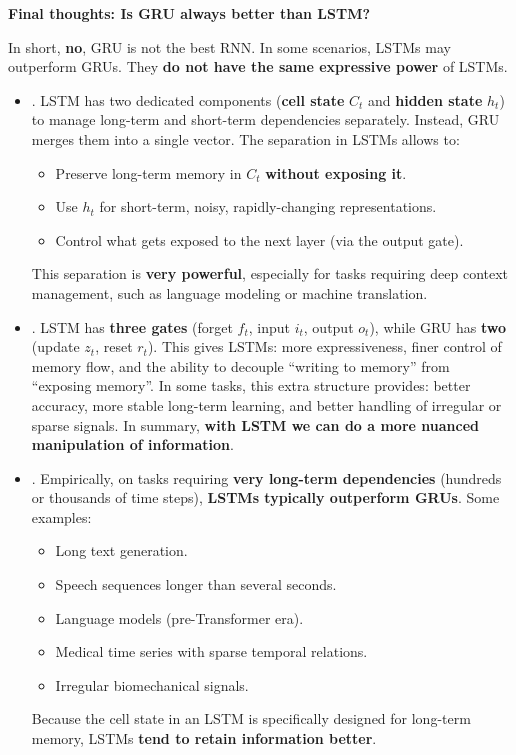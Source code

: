 \begin{flushleft}
    \textcolor{Green3}{ \textbf{Final thoughts: Is GRU always better than LSTM?}}
\end{flushleft}
In short, \textbf{no}, GRU is not the best RNN. In some scenarios, LSTMs may outperform GRUs. They \textbf{do not have the same expressive power} of LSTMs.
\begin{itemize}
    \item {}. LSTM has two dedicated components (\textbf{cell state} $C_t$ and \textbf{hidden state} $h_t$) to manage long-term and short-term dependencies separately. Instead, GRU merges them into a single vector. The separation in LSTMs allows to:
    \begin{itemize}
        \item Preserve long-term memory in $C_t$ \textbf{without exposing it}.
        \item Use $h_t$ for short-term, noisy, rapidly-changing representations.
        \item Control what gets exposed to the next layer (via the output gate).
    \end{itemize}
    This separation is \textbf{very powerful}, especially for tasks requiring deep context management, such as language modeling or machine translation.


    \item {}. LSTM has \textbf{three gates} (forget $f_t$, input $i_t$, output $o_t$), while GRU has \textbf{two} (update $z_t$, reset $r_t$). This gives LSTMs: more expressiveness, finer control of memory flow, and the ability to decouple ``writing to memory'' from ``exposing memory''. In some tasks, this extra structure provides: better accuracy, more stable long-term learning, and better handling of irregular or sparse signals. In summary, \textbf{with LSTM we can do a more nuanced manipulation of information}.


    \item {}. Empirically, on tasks requiring \textbf{very long-term dependencies} (hundreds or thousands of time steps), \textbf{LSTMs typically outperform GRUs}. Some examples:
    \begin{itemize}
        \item Long text generation.
        \item Speech sequences longer than several seconds.
        \item Language models (pre-Transformer era).
        \item Medical time series with sparse temporal relations.
        \item Irregular biomechanical signals.
    \end{itemize}
    Because the cell state in an LSTM is specifically designed for long-term memory, LSTMs \textbf{tend to retain information better}. 
    

\end{itemize}
